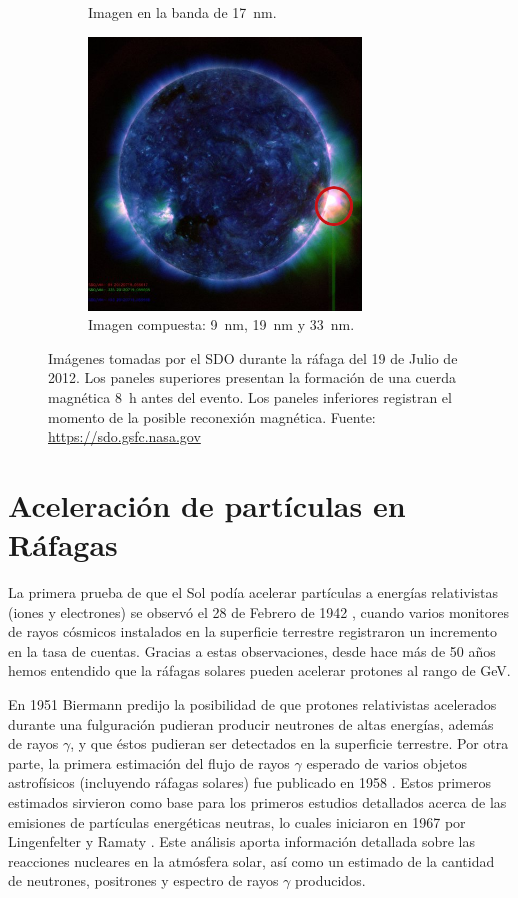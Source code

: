 \begin{figure}
\begin{subfigure}[b]{0.49\textwidth}
                \caption*{Imagen en la banda de \SI{17}{\nano\metre}.}
        \end{subfigure}
        \begin{subfigure}[b]{0.49\textwidth}
                \includegraphics[width=7.25cm]{sdo120719-0555-c}
                \caption*{Imagen compuesta: \SI{9}{\nano\metre}, \SI{19}{\nano\metre} y \SI{33}{\nano\metre}.}
        \end{subfigure}
        \caption{Imágenes tomadas por el SDO durante la ráfaga del \num{19} de Julio de \num{2012}. Los paneles superiores presentan la formación de una cuerda magnética \SI{8}{\hour} antes del evento. Los paneles inferiores registran el momento de la posible reconexión magnética. Fuente: \url{https://sdo.gsfc.nasa.gov}}
        \label{fig:flare-euv}
\end{figure}

\section{Aceleración de partículas en Ráfagas}
\label{sec:acel-part}

La primera prueba de que el Sol podía acelerar partículas a energías relativistas (iones y electrones) se observó el \num{28} de Febrero de \num{1942} \cite{lange42}, cuando varios monitores de rayos cósmicos instalados en la superficie terrestre registraron un incremento en la tasa de cuentas. Gracias a estas observaciones, desde hace más de \num{50} años hemos entendido que la ráfagas solares pueden acelerar protones al rango de \si{\giga\electronvolt}.

En \num{1951} Biermann \cite{bierman51} predijo la posibilidad de que protones relativistas acelerados durante una fulguración pudieran producir neutrones de altas energías, además de rayos $\gamma$, y que éstos pudieran ser detectados en la superficie terrestre. Por otra parte, la primera estimación del flujo de rayos $\gamma$ esperado de varios objetos astrofísicos (incluyendo ráfagas solares) fue publicado en \num{1958} \cite{morrison58}. Estos primeros estimados sirvieron como base para los primeros estudios detallados acerca de las emisiones de partículas energéticas neutras, lo cuales iniciaron en \num{1967} por Lingenfelter y Ramaty \cite{lingen67}. Este análisis aporta información detallada sobre las reacciones nucleares en la atmósfera solar, así como un estimado de la cantidad de neutrones, positrones y espectro de rayos $\gamma$ producidos.

